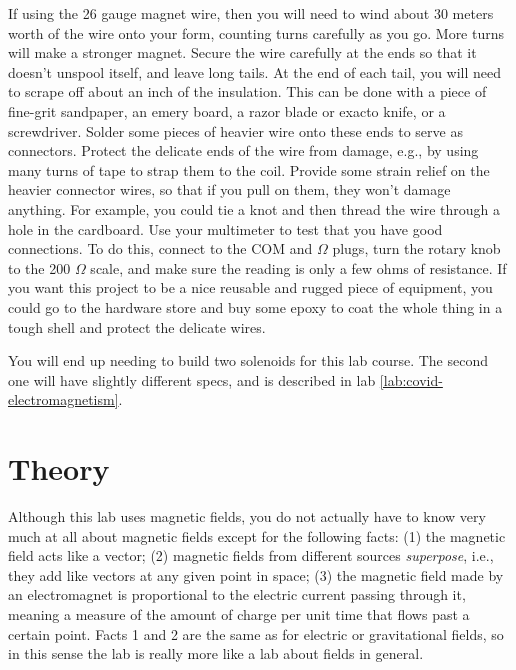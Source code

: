If using the 26 gauge magnet wire, then you will need to wind about 30 meters worth
of the wire onto your form, counting turns carefully as you go. More turns will make a stronger
magnet. Secure the wire carefully
at the ends so that it doesn't unspool itself, and leave long tails. At the end of each tail,
you will need to scrape off about an inch of the insulation. This can be done with a piece of
fine-grit sandpaper, an emery board, a razor blade or exacto knife, or a screwdriver.
Solder some pieces of heavier wire onto these ends to serve as connectors. Protect the
delicate ends of the wire from damage, e.g., by using many turns of tape to strap them
to the coil. Provide some strain relief on the heavier connector wires, so that if you pull
on them, they won't damage anything. For example, you could tie a knot and then thread the
wire through a hole in the cardboard. Use your multimeter to test that you have good connections.
To do this, connect to the COM and $\Omega$ plugs, turn the rotary knob to the 200 $\Omega$ scale,
and make sure the reading is only a few ohms of resistance. If you want this project to be
a nice reusable and rugged piece of equipment, you could go to the hardware store and buy some
epoxy to coat the whole thing in a tough shell and protect the delicate wires.

You will end up needing to build two solenoids for this lab course. The second one will have
slightly different specs, and is described in lab \ref{lab:covid-electromagnetism}.

\section*{Theory}

Although this lab uses magnetic fields, you do not actually have to know very much at all about magnetic fields except for
the following facts: (1) the magnetic field acts like a vector; (2) magnetic fields from different sources \emph{superpose}, i.e.,
they add like vectors at any given point in space; (3) the magnetic field made by an electromagnet is proportional to the electric
current passing through it, meaning a measure of the amount of charge per unit time that flows past a certain point.
Facts 1 and 2 are the same as for electric or gravitational fields, so in this sense the lab is really more like a lab about
fields in general.

